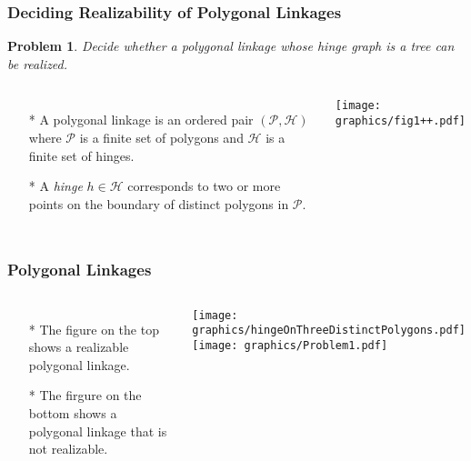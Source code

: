 \documentclass{beamer}
\newtheorem{prob}{Problem}
\newcommand{\HH}{{\mathcal{H}}} %
\renewcommand{\PP}{{\mathcal{P}}} %
\begin{document}
\begin{frame}\frametitle{Deciding Realizability of Polygonal Linkages}
	\begin{prob}
	Decide whether a polygonal linkage whose hinge graph is a \textit{tree} can be realized.
	\end{prob}
	\begin{columns}[c] %
   \begin{itemize}
            \item[*]  A polygonal linkage is an ordered pair $\left(\PP,\HH \right)$ where $\PP$ is a finite set of polygons and $\HH$ is a finite set of hinges.
            \item[*]  A \textit{hinge} $h\in \HH$ corresponds to two or more points on the boundary of distinct polygons in $\PP$. 
    \end{itemize}
  \begin{minipage}{\linewidth}
            \begin{center}
            \texttt{[image: graphics/fig1++.pdf]}
            \end{center}
        \end{minipage}
    \end{columns}
\end{frame}

\begin{frame}\frametitle{Polygonal Linkages}
    \begin{columns}[c]
        \begin{itemize}
        	\item[*] The figure on the top shows a realizable polygonal linkage.
        	\item[*] The firgure on the bottom shows a polygonal linkage that is not realizable.
    	\end{itemize}
        \begin{minipage}{\linewidth}
            \begin{center}
            \texttt{[image: graphics/hingeOnThreeDistinctPolygons.pdf]}\vspace{.25in}
            \texttt{[image: graphics/Problem1.pdf]}
            \end{center}
        \end{minipage}
    \end{columns}
\end{frame}
\end{document}
